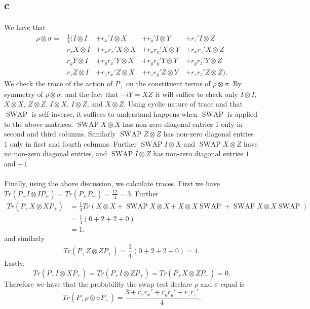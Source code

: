 \documentclass[letterpaper,12pt,oneside,onecolumn]{article}
\DeclareMathOperator{\swap}{SWAP}
\begin{document}
\subsection{c}
\paragraph{}
We have that
\begin{align*}
\rho\otimes\sigma = &\frac{1}{4}(I \otimes I &+ r_x' I \otimes X &+ r_y' I \otimes Y &+ r_z' I \otimes Z \\
&r_x X\otimes I &+ r_xr_x' X\otimes X &+ r_xr_y' X\otimes Y &+ r_xr_z' X \otimes Z \\
&r_y Y \otimes I &+ r_yr_x'Y\otimes X &+ r_yr_y' Y \otimes Y &+ r_yr_z' Y \otimes Z \\
&r_z Z\otimes I &+ r_zr_x' Z\otimes X &+ r_zr_y' Z \otimes Y &+ r_zr_z' Z\otimes Z).
\end{align*}
We check the trace of the action of $P_+$ on the constituent terms of $\rho \otimes \sigma$. By symmetry of $\rho \otimes \sigma$, and the fact that $-iY = XZ$ it will suffice to check only $I\otimes I$, $X\otimes X$, $Z\otimes Z$, $I \otimes X$, $I\otimes Z$, and $X\otimes Z$. Using cyclic nature of trace and that $\swap$ is self-inverse, it suffices to understand happens when $\swap$ is applied to the above matrices. $\swap X\otimes X$ has non-zero diagonal entries $1$ only in second and third columns. Similarly $\swap Z\otimes Z$ has non-zero diagonal entries $1$ only in first and fourth columns. Further $\swap I \otimes X$ and $\swap X\otimes Z$ have no non-zero diagonal entries, and $\swap I \otimes Z$ has non-zero diagonal entries $1$ and $-1$.
\paragraph{}
Finally, using the above discussion, we calculate traces. First we have $Tr(P_+I\otimes I P_+) = Tr(P_+P_+) = \frac{12}{4} = 3$. Further
\begin{align*}
Tr(P_+ X\otimes X P_+) &= \frac{1}{4}Tr(X\otimes X + \swap X\otimes X + X\otimes X \swap + \swap X\otimes X \swap )\\
&= \frac{1}{4}(0 + 2 + 2 + 0)\\
&= 1.
\end{align*}
and similarly
$$Tr(P_+ Z \otimes Z P_+) = \frac{1}{4}(0 + 2 + 2 + 0) = 1.$$
Lastly,
$$Tr(P_+ I \otimes X P_+) = Tr(P_+ I \otimes Z P_+) = Tr(P_+ X\otimes Z P_+) = 0.$$
Therefore we have that the probability the swap test declare $\rho$ and $\sigma$ equal is
$$Tr(P_+ \rho \otimes \sigma P_+) = \frac{3 + r_xr_x' + r_yr_y' + r_zr_z'}{4}.$$
\newpage
\end{document}
